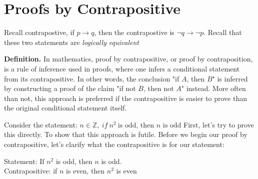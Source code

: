 \documentclass{report}
\begin{document}
    \section{\LARGE Proofs by Contrapositive}
    \bigbreak \noindent 
    Recall contrapostive, if $p \rightarrow q $, then the contrapostive is $\neg q \rightarrow \neg p$. Recall that these two statements are \textit{logically equivalent}
    \bigbreak \noindent 
\begin{definition}
    \textbf{Definition.} In mathematics, proof by contrapositive, or proof by contraposition, is a rule of inference used in proofs, where one infers a conditional statement from its contrapositive. In other words, the conclusion "if $A$, then $B$" is inferred by constructing a proof of the claim "if not $B$, then not $A$" instead. More often than not, this approach is preferred if the contrapositive is easier to prove than the original conditional statement itself.
\end{definition}
    \bigbreak \noindent 
    Consider the statement: \textit{$n \in \mathbb{Z},\ if\ n^{2}\ \text{is odd, then $n$ is odd}$}
    \bigbreak \noindent 
    First, let's try to prove this directly. To show that this approach is futile.
    \bigbreak \noindent 
    \bigbreak \noindent 
    Before we begin our proof by contrapositive, let's clarify what the contrapositive is for our statement: 
    \begin{center}
        Statement: If $n^{2}$ is odd, then $n$ is odd. \\
        Contrapositive: if $n$ is even, then $n^{2}$ is even
    \end{center}
\end{document}
